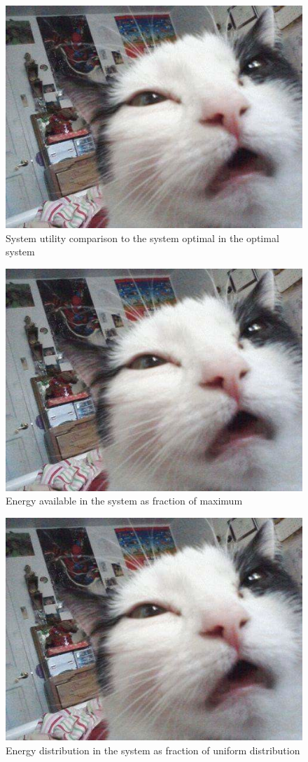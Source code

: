 
\begin{figure}[ht]
	\centering
	\includegraphics[width=0.8\linewidth]{5_ewsn_durations-system-utility-no-label}
	\captionsetup{labelfont=bf,singlelinecheck=on}
	\caption{System utility comparison to the system optimal in the optimal system}
	\label{fig:5_ewsn_durations-system-utility-no-label}
\end{figure}
\begin{figure}[ht]
	\centering
	\includegraphics[width=0.8\linewidth]{5_ewsn_energy-availability}
	\captionsetup{labelfont=bf,singlelinecheck=on}
	\caption{Energy available in the system as fraction of maximum}
	\label{fig:5_ewsn_energy-availability}
\end{figure}
\begin{figure}[ht]
	\centering
	\includegraphics[width=0.8\linewidth]{5_ewsn_energy-distribution}
	\captionsetup{labelfont=bf,singlelinecheck=on}
	\caption{Energy distribution in the system as fraction of uniform distribution}
	\label{fig:5_ewsn_energy-distribution}
\end{figure}
